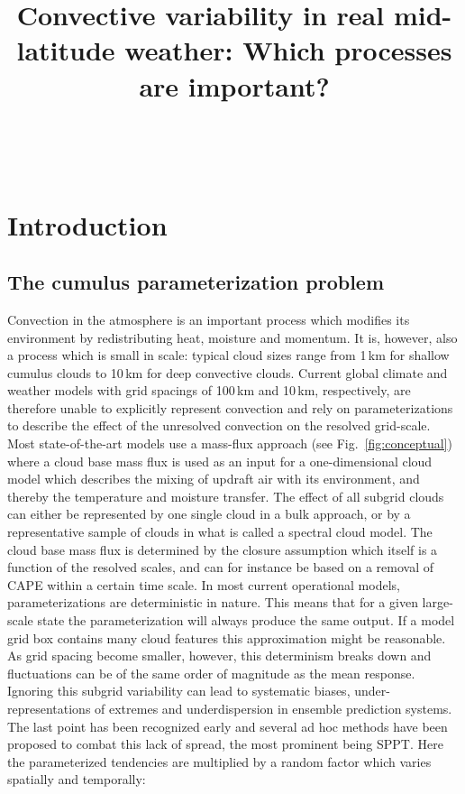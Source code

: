 \documentclass[a4paper, 12pt]{article}
\title{Convective variability in real mid-latitude weather: Which processes are important?}
\begin{document}
\maketitle\

\tableofcontents
	
\section{Introduction}

\subsection{The cumulus parameterization problem}

Convection in the atmosphere is an important process which modifies its environment by redistributing heat, moisture and momentum. It is, however, also a process which is small in scale: typical cloud sizes range from 1\,km for shallow cumulus clouds to 10\,km for deep convective clouds. Current global climate and weather models with grid spacings of 100\,km and 10\,km, respectively, are therefore unable to explicitly represent convection and rely on parameterizations to describe the effect of the unresolved convection on the resolved grid-scale. Most state-of-the-art models use a mass-flux approach (see Fig.~\ref{fig:conceptual}) where a cloud base mass flux is used as an input for a one-dimensional cloud model which describes the mixing of updraft air with its environment, and thereby the temperature and moisture transfer. The effect of all subgrid clouds can either be represented by one single cloud in a bulk approach, or by a representative sample of clouds in what is called a spectral cloud model. The cloud base mass flux is determined by the closure assumption which itself is a function of the resolved scales, and can for instance be based on a removal of CAPE within a certain time scale. In most current operational models, parameterizations are deterministic in nature. This means that for a given large-scale state the parameterization will always produce the same output. If a model grid box contains many cloud features this approximation might be reasonable. As grid spacing become smaller, however, this determinism breaks down and fluctuations can be of the same order of magnitude as the mean response. Ignoring this subgrid variability can lead to systematic biases, under-representations of extremes and underdispersion in ensemble prediction systems. The last point has been recognized early and several ad hoc methods have been proposed to combat this lack of spread, the most prominent being SPPT. Here the parameterized tendencies are multiplied by a random factor which varies spatially and temporally: 
\end{document}
